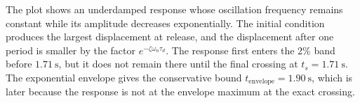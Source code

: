 \clearpage
{}



The plot shows an underdamped response whose oscillation frequency remains constant while its amplitude decreases exponentially. The initial condition produces the largest displacement at release, and the displacement after one period is smaller by the factor $e^{-\zeta\omega_n\tau_d}$. The response first enters the 2\% band before $1.71\ \mathrm{s}$, but it does not remain there until the final crossing at $t_s=1.71\ \mathrm{s}$. The exponential envelope gives the conservative bound $t_{\mathrm{envelope}}=1.90\ \mathrm{s}$, which is later because the response is not at the envelope maximum at the exact crossing.

\endgroup
